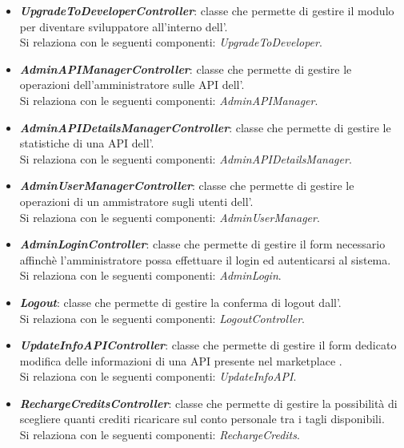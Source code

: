 \begin{itemize}
\begin{itemize}
		\item \textbf{\textit{UpgradeToDeveloperController}}: classe che permette di gestire il modulo per diventare sviluppatore all'interno dell'\progetto.\\
		Si relaziona con le seguenti componenti: \textit{UpgradeToDeveloper}.
		
		\item \textbf{\textit{AdminAPIManagerController}}: classe che permette di gestire le operazioni dell'amministratore sulle API dell'\progetto.\\
		Si relaziona con le seguenti componenti: \textit{AdminAPIManager}.
		
		\item \textbf{\textit{AdminAPIDetailsManagerController}}: classe che permette di gestire le statistiche di una API dell'\progetto.\\
		Si relaziona con le seguenti componenti: \textit{AdminAPIDetailsManager}.
		
		\item \textbf{\textit{AdminUserManagerController}}: classe che permette di gestire le operazioni di un ammistratore sugli utenti dell'\progetto.\\
		Si relaziona con le seguenti componenti: \textit{AdminUserManager}.
		
		\item \textbf{\textit{AdminLoginController}}: classe che permette di gestire il form necessario affinchè l'amministratore possa effettuare il login ed autenticarsi al sistema.\\
		Si relaziona con le seguenti componenti: \textit{AdminLogin}.
		
		\item \textbf{\textit{Logout}}: classe che permette di gestire la conferma di logout dall'\progetto.\\
		Si relaziona con le seguenti componenti: \textit{LogoutController}.
		
		\item \textbf{\textit{UpdateInfoAPIController}}: classe che permette di gestire il form dedicato modifica delle informazioni di una API presente nel marketplace \progetto.\\
		Si relaziona con le seguenti componenti: \textit{UpdateInfoAPI}.
		
		\item \textbf{\textit{RechargeCreditsController}}: classe che permette di gestire la possibilità di scegliere quanti crediti ricaricare sul conto personale tra i tagli disponibili.\\
		Si relaziona con le seguenti componenti: \textit{RechargeCredits}.
		

\end{itemize}
\end{itemize}
